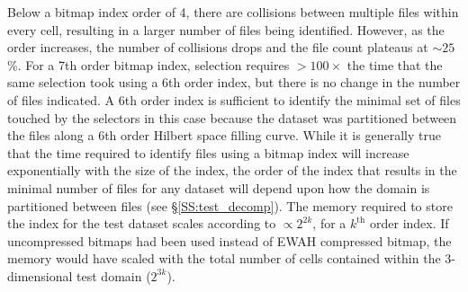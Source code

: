 \documentclass[apjl]{emulateapj}
\begin{document}
Below a bitmap index order of 4, there are collisions between multiple files within every cell, resulting in a larger number of files being identified. However, as the order increases, the number of collisions drops and the file count plateaus at $\sim25$\%. For a 7th order bitmap index, selection requires $>100\times$ the time that the same selection took using a 6th order index, but there is no change in the number of files indicated. A 6th order index is sufficient to identify the minimal set of files touched by the selectors in this case because the dataset was partitioned between the files along a 6th order Hilbert space filling curve. While it is generally true that the time required to identify files using a bitmap index will increase exponentially with the size of the index, the order of the index that results in the minimal number of files for any dataset will depend upon how the domain is partitioned between files (see \S\ref{SS:test_decomp}). The memory required to store the index for the test dataset scales according to $\propto2^{2k}$, for a $k^{\mbox{th}}$ order index. If uncompressed bitmaps had been used instead of EWAH compressed bitmap, the memory would have scaled with the total number of cells contained within the 3-dimensional test domain ($2^{3k}$).

\end{document}
